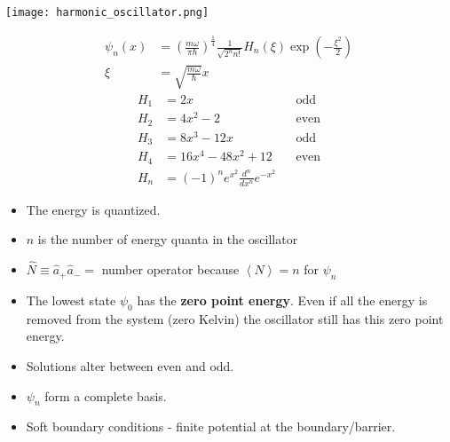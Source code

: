 \texttt{[image: harmonic\_oscillator.png]}


\noindent\begin{align*}
    \psi_n(x) & ={\left(\frac{m\omega}{\pi\hbar}\right)}^{\frac{1}{4}}\frac{1}{\sqrt{2^n n!}}H_n(\xi)\exp\left(-\frac{\xi^2}{2}\right) \\
    \xi       & =\sqrt{\frac{m\omega}{\hbar}}x
\end{align*}
{\tiny\noindent\begin{align*}
    H_1 & = 2x                                       &  & \text{odd}  \\
    H_2 & = 4x^2-2                                   &  & \text{even} \\
    H_3 & = 8x^3-12x                                 &  & \text{odd}  \\
    H_4 & = 16x^4-48x^2+12                           &  & \text{even} \\
    H_n & = {(-1)}^n e^{x^2} \frac{d^n}{dx^n} e^{-x^2}
\end{align*}
}

\begin{itemize}
    \item The energy is quantized.
    \item $n$ is the number of energy quanta in the oscillator
    \item $\widehat{N} \equiv \hat{a}_{+}\hat{a}_{-} = $ number operator because $\left<N\right> = n$ for $\psi_n$
    \item The lowest state $\psi_0$ has the \textbf{zero point energy}. Even if all the energy is removed from the system (zero Kelvin) the oscillator still has this zero point energy.
    \item Solutions alter between even and odd.
    \item $\psi_n$ form a complete basis.
    \item Soft boundary conditions - finite potential at the boundary/barrier.
\end{itemize}


